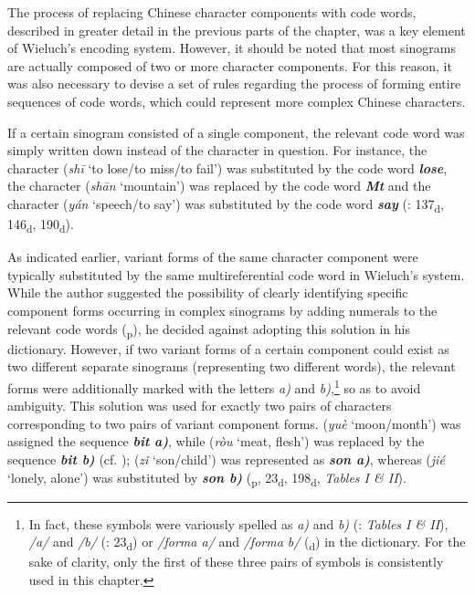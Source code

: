 \documentclass[output=paper,colorlinks,citecolor=brown,arabicfont,chinesefont]{langscibook}
\begin{document}
The process of replacing Chinese character components with code words, described in greater detail in the previous parts of the chapter, was a key element of Wieluch's encoding system. However, it should be noted that most sinograms are actually composed of two or more character components. For this reason, it was also necessary to devise a set of rules regarding the process of forming entire sequences of code words, which could represent more complex Chinese characters.

If a certain sinogram consisted of a single component, the relevant code word was simply written down instead of the character in question. For instance, the character {} (\emph{shī} ‘to lose/to miss/to fail’) was substituted by the code word \textbf{\emph{lose}}, the character {} (\emph{shān} ‘mountain’) was replaced by the code word \textbf{\emph{Mt}} and the character {} (\emph{yán} ‘speech/to say’) was substituted by the code word \textbf{\emph{say}} (\citealt{Wieluch1936}: 137\textsubscript{d}, 146\textsubscript{d}, 190\textsubscript{d}).

As indicated earlier, variant forms of the same character component were typically substituted by the same multireferential code word in Wieluch's system. While the author suggested the possibility of clearly identifying specific component forms occurring in complex sinograms by adding numerals to the relevant code words (\citealt[9]{Wieluch1936}\textsubscript{p}), he decided against adopting this solution in his dictionary. However, if two variant forms of a certain component could exist as two different separate sinograms (representing two different words), the relevant forms were additionally marked with the letters \emph{a)} and \emph{b)},\footnote{In fact, these symbols were variously spelled as \emph{a)} and \emph{b)} (\citealt{Wieluch1936}: \emph{Tables I \& II}), \emph{/a/} and \emph{/b/} (\citealt{Wieluch1936}: 23\textsubscript{d}) or \emph{/forma a/} and \emph{/forma b/} (\citealt[198]{Wieluch1936}\textsubscript{d}) in the dictionary. For the sake of clarity, only the first of these three pairs of symbols is consistently used in this chapter.}  so as to avoid ambiguity. This solution was used for exactly two pairs of characters corresponding to two pairs of variant component forms. {} (\emph{yuè} ‘moon/month’) was assigned the sequence \textbf{\emph{bit a)}}, while {} (\emph{ròu} ‘meat, flesh’) was replaced by the sequence \textbf{\emph{bit b)}} (cf. ); {} (\emph{zǐ} ‘son/child’) was represented as \textbf{\emph{son a)}}, whereas {} (\emph{jié} ‘lonely, alone’) was substituted by \textbf{\emph{son b)}} (\citealt[9]{Wieluch1936}\textsubscript{p}, 23\textsubscript{d}, 198\textsubscript{d}, \emph{Tables I \& II}).
\end{document}
